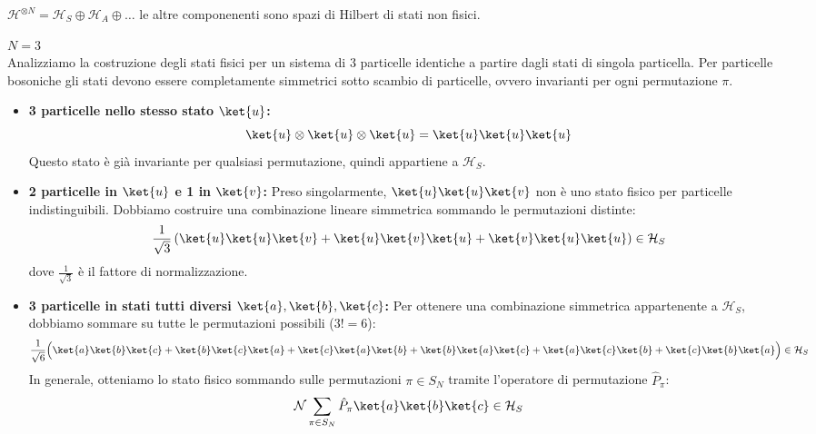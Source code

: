 \begin{remark}
    \(\mathcal{H}^{\otimes N}= \mathcal{H}_S \oplus \mathcal{H}_A \oplus \dots\) le altre componenenti sono spazi di Hilbert di stati non fisici.
\end{remark}


\begin{example}
    \textbf{\(N=3\)}\\
    Analizziamo la costruzione degli stati fisici per un sistema di 3 particelle identiche a partire dagli stati di singola particella.
    Per particelle bosoniche gli stati devono essere completamente simmetrici sotto scambio di particelle, ovvero invarianti per ogni permutazione \(\pi\).
    \begin{itemize}
        \item \textbf{3 particelle nello stesso stato \(\ket{u}\):}
        \[
            \ket{u}\otimes\ket{u}\otimes\ket{u} = \ket{u}\ket{u}\ket{u}
        \]
        Questo stato è già invariante per qualsiasi permutazione, quindi appartiene a \(\mathcal{H}_S\).

        \item \textbf{2 particelle in \(\ket{u}\) e 1 in \(\ket{v}\):}
        Preso singolarmente, \(\ket{u}\ket{u}\ket{v}\) non è uno stato fisico per particelle indistinguibili. Dobbiamo costruire una combinazione lineare simmetrica sommando le permutazioni distinte:
        \[
            \frac{1}{\sqrt{3}}\left( \ket{u}\ket{u}\ket{v} + \ket{u}\ket{v}\ket{u} + \ket{v}\ket{u}\ket{u} \right) \in \mathcal{H}_S
        \]
        dove \(\frac{1}{\sqrt{3}}\) è il fattore di normalizzazione.

        \item \textbf{3 particelle in stati tutti diversi \(\ket{a}, \ket{b}, \ket{c}\):}
        Per ottenere una combinazione simmetrica appartenente a \(\mathcal{H}_S\), dobbiamo sommare su tutte le permutazioni possibili (\(3! = 6\)):
        \[
            \frac{1}{\sqrt{6}}\Big( \ket{a}\ket{b}\ket{c} + \ket{b}\ket{c}\ket{a} + \ket{c}\ket{a}\ket{b} + \ket{b}\ket{a}\ket{c} + \ket{a}\ket{c}\ket{b} + \ket{c}\ket{b}\ket{a} \Big) \in \mathcal{H}_S
        \]
        In generale, otteniamo lo stato fisico sommando sulle permutazioni \(\pi \in S_N\) tramite l'operatore di permutazione \(\hat{P}_\pi\):
        \[
            \mathcal{N} \sum_{\pi \in S_N} \hat{P}_\pi \ket{a}\ket{b}\ket{c} \in \mathcal{H}_S
        \]
    \end{itemize}


\end{example}

